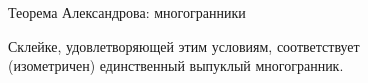 \begin{frame}{Теорема Александрова: многогранники} \ \\
\begin{thm}
	Склейке, удовлетворяющей этим условиям, соответствует\\
	(изометричен) единственный выпуклый многогранник.
\end{thm} \medskip
\begin{figure}
	\centering
	\begin{subfigure}[m]{0.38\textwidth}
		\centering
		
	\end{subfigure}
~
	\centering
	\begin{subfigure}[m]{0.38\textwidth}
		\centering
		
	\end{subfigure}
\end{figure}
\end{frame}
